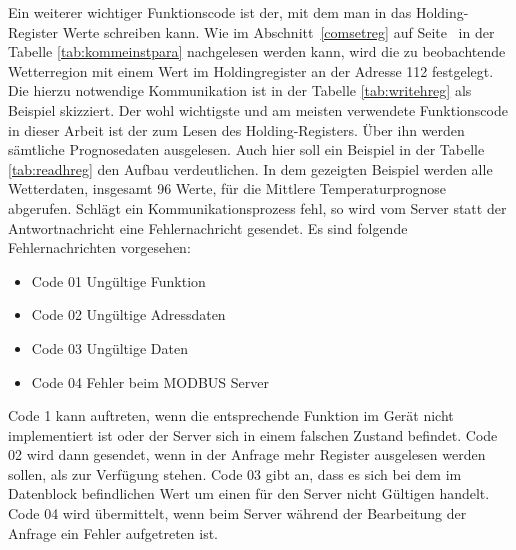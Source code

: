 Ein weiterer wichtiger Funktionscode ist der, mit dem man in das Holding-Register Werte schreiben kann. Wie im Abschnitt~\ref{comsetreg} auf Seite~\pageref{comsetreg} in der Tabelle \ref{tab:kommeinstpara} nachgelesen werden kann, wird die zu beobachtende Wetterregion mit einem Wert im Holdingregister an der Adresse 112 festgelegt. Die hierzu notwendige Kommunikation ist in der Tabelle \ref{tab:writehreg} als Beispiel skizziert. Der wohl wichtigste und am meisten verwendete Funktionscode in dieser Arbeit ist der zum Lesen des Holding-Registers. Über ihn werden sämtliche Prognosedaten ausgelesen. Auch hier soll ein Beispiel in der Tabelle \ref{tab:readhreg} den Aufbau verdeutlichen. In dem gezeigten Beispiel werden alle Wetterdaten, insgesamt 96 Werte, für die Mittlere Temperaturprognose abgerufen. Schlägt ein Kommunikationsprozess fehl, so wird vom Server statt der Antwortnachricht eine Fehlernachricht gesendet. Es sind folgende Fehlernachrichten vorgesehen:
\begin{itemize}
\item Code 01 Ungültige Funktion
\item Code 02 Ungültige Adressdaten
\item Code 03 Ungültige Daten
\item Code 04 Fehler beim MODBUS Server
\end{itemize}
Code 1 kann auftreten, wenn die entsprechende Funktion im Gerät nicht implementiert ist oder der Server sich in einem falschen Zustand befindet. Code 02 wird dann gesendet, wenn in der Anfrage mehr Register ausgelesen werden sollen, als zur Verfügung stehen. Code 03 gibt an, dass es sich bei dem im Datenblock befindlichen Wert um einen für den Server nicht Gültigen handelt. Code 04 wird übermittelt, wenn beim Server während der Bearbeitung der Anfrage ein Fehler aufgetreten ist.    

  


     
      
